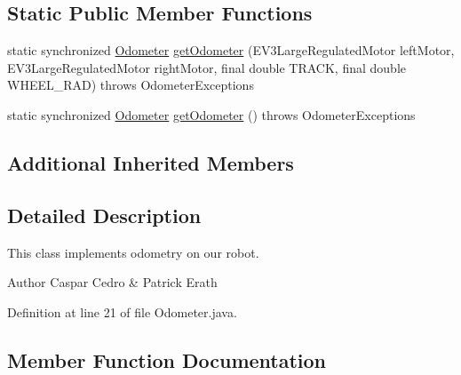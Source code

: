 \subsection*{Static Public Member Functions}
\begin{DoxyCompactItemize}
\item 
static synchronized \hyperlink{classca_1_1mcgill_1_1ecse211_1_1odometer_1_1_odometer}{Odometer} \hyperlink{classca_1_1mcgill_1_1ecse211_1_1odometer_1_1_odometer_a99171f11e34dea918fa9dd069d721439}{get\+Odometer} (E\+V3\+Large\+Regulated\+Motor left\+Motor, E\+V3\+Large\+Regulated\+Motor right\+Motor, final double T\+R\+A\+CK, final double W\+H\+E\+E\+L\+\_\+\+R\+AD)  throws Odometer\+Exceptions 
\item 
static synchronized \hyperlink{classca_1_1mcgill_1_1ecse211_1_1odometer_1_1_odometer}{Odometer} \hyperlink{classca_1_1mcgill_1_1ecse211_1_1odometer_1_1_odometer_a4e069b5a96cd43b29af0785244a99b51}{get\+Odometer} ()  throws Odometer\+Exceptions 
\end{DoxyCompactItemize}
\subsection*{Additional Inherited Members}


\subsection{Detailed Description}
This class implements odometry on our robot.

\begin{DoxyAuthor}{Author}
Caspar Cedro \& Patrick Erath 
\end{DoxyAuthor}


Definition at line 21 of file Odometer.\+java.



\subsection{Member Function Documentation}
\mbox{\label{classca_1_1mcgill_1_1ecse211_1_1odometer_1_1_odometer_a99171f11e34dea918fa9dd069d721439}} 
